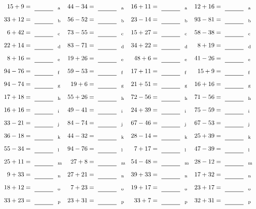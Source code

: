 \documentclass
[
  draft    = true,
  fontsize = 11pt,
  parskip  = half-
]
{scrartcl}
\begin{document}
\clearpage
\begin{align*}
    \pline{15+9}&=\rline{a}
  & \pline{44-34}&=\rline{a}
  & \pline{16+11}&=\rline{a}
  & \pline{12+16}&=\rline{a} \\[1ex]
    \pline{33+12}&=\rline{b}
  & \pline{56-52}&=\rline{b}
  & \pline{23-14}&=\rline{b}
  & \pline{93-81}&=\rline{b} \\[1ex]
    \pline{6+42}&=\rline{c}
  & \pline{73-55}&=\rline{c}
  & \pline{15+27}&=\rline{c}
  & \pline{58-38}&=\rline{c} \\[1ex]
    \pline{22+14}&=\rline{d}
  & \pline{83-71}&=\rline{d}
  & \pline{34+22}&=\rline{d}
  & \pline{8+19}&=\rline{d} \\[1ex]
    \pline{8+16}&=\rline{e}
  & \pline{19+26}&=\rline{e}
  & \pline{48+6}&=\rline{e}
  & \pline{41-26}&=\rline{e} \\[1ex]
    \pline{94-76}&=\rline{f}
  & \pline{59-53}&=\rline{f}
  & \pline{17+11}&=\rline{f}
  & \pline{15+9}&=\rline{f} \\[1ex]
    \pline{94-74}&=\rline{g}
  & \pline{19+6}&=\rline{g}
  & \pline{21+51}&=\rline{g}
  & \pline{16+16}&=\rline{g} \\[1ex]
    \pline{17+18}&=\rline{h}
  & \pline{55+26}&=\rline{h}
  & \pline{72-56}&=\rline{h}
  & \pline{71-56}&=\rline{h} \\[1ex]
    \pline{16+16}&=\rline{i}
  & \pline{49-41}&=\rline{i}
  & \pline{24+39}&=\rline{i}
  & \pline{75-59}&=\rline{i} \\[1ex]
    \pline{33-21}&=\rline{j}
  & \pline{84-74}&=\rline{j}
  & \pline{67-46}&=\rline{j}
  & \pline{67-53}&=\rline{j} \\[1ex]
    \pline{36-18}&=\rline{k}
  & \pline{44-32}&=\rline{k}
  & \pline{28-14}&=\rline{k}
  & \pline{25+39}&=\rline{k} \\[1ex]
    \pline{55-34}&=\rline{l}
  & \pline{94-76}&=\rline{l}
  & \pline{7+17}&=\rline{l}
  & \pline{47-39}&=\rline{l} \\[1ex]
    \pline{25+11}&=\rline{m}
  & \pline{27+8}&=\rline{m}
  & \pline{54-48}&=\rline{m}
  & \pline{28-12}&=\rline{m} \\[1ex]
    \pline{9+33}&=\rline{n}
  & \pline{27+21}&=\rline{n}
  & \pline{39+33}&=\rline{n}
  & \pline{17+32}&=\rline{n} \\[1ex]
    \pline{18+12}&=\rline{o}
  & \pline{7+23}&=\rline{o}
  & \pline{19+17}&=\rline{o}
  & \pline{23+17}&=\rline{o} \\[1ex]
    \pline{33+23}&=\rline{p}
  & \pline{23+31}&=\rline{p}
  & \pline{33+7}&=\rline{p}
  & \pline{32+31}&=\rline{p}
\end{align*}
\end{document}
